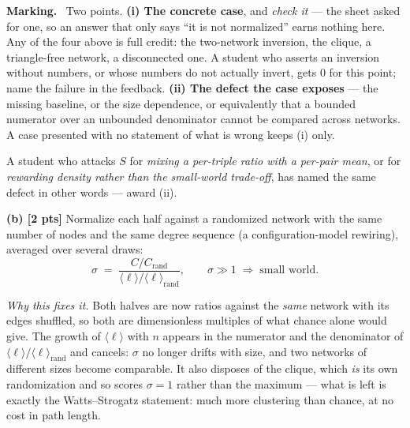 \documentclass[a4paper, 12pt]{extarticle}
\newenvironment{grading}
  {\begin{tcolorbox}[colback=pltblue!4, colframe=pltblue!35, boxrule=0.5pt,
                     sharp corners, boxsep=2pt, left=6pt, right=6pt,
                     top=4pt, bottom=4pt]\footnotesize\textbf{Marking.}\ }
  {\end{tcolorbox}}
\begin{document}
\begin{grading}
Two points.
\textbf{(i) The concrete case}, and \emph{check it} --- the sheet asked for one,
so an answer that only says ``it is not normalized'' earns nothing here. Any
of the four above is full credit: the two-network inversion, the clique, a
triangle-free network, a disconnected one. A student who asserts an inversion
without numbers, or whose numbers do not actually invert, gets 0 for this
point; name the failure in the feedback.
\textbf{(ii) The defect the case exposes} --- the missing baseline, or the
size dependence, or equivalently that a bounded numerator over an unbounded
denominator cannot be compared across networks. A case presented with no
statement of what is wrong keeps (i) only.

A student who attacks $S$ for \emph{mixing a per-triple ratio with a per-pair
mean}, or for \emph{rewarding density rather than the small-world trade-off},
has named the same defect in other words --- award (ii).
\end{grading}

\textbf{(b) [2 pts]} Normalize each half against a randomized network with the
same number of nodes and the same degree sequence (a configuration-model
rewiring), averaged over several draws:
\[
  \sigma \;=\; \frac{C / C_{\text{rand}}}{\langle\ell\rangle /
  \langle\ell\rangle_{\text{rand}}}, \qquad \sigma \gg 1
  \;\Longrightarrow\; \text{small world.}
\]

\emph{Why this fixes it.} Both halves are now ratios against the \emph{same}
network with its edges shuffled, so both are dimensionless multiples of what
chance alone would give. The growth of $\langle\ell\rangle$ with $n$ appears in
the numerator and the denominator of $\langle\ell\rangle / \langle\ell\rangle
_{\text{rand}}$ and cancels: $\sigma$ no longer drifts with size, and two
networks of different sizes become comparable. It also disposes of the clique,
which \emph{is} its own randomization and so scores $\sigma = 1$ rather than the
maximum --- what is left is exactly the Watts--Strogatz statement: much more
clustering than chance, at no cost in path length.
\end{document}
